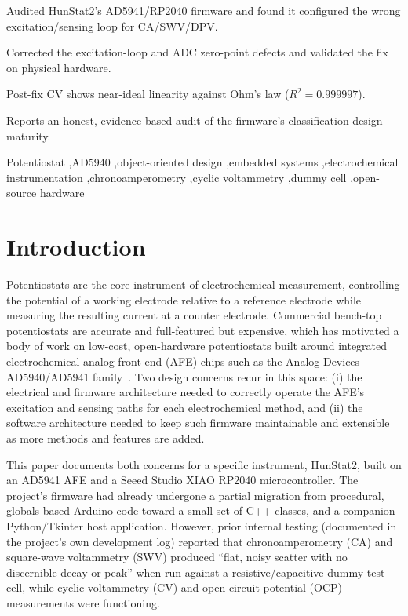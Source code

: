 \documentclass[preprint,12pt]{elsarticle}
\begin{document}
\begin{frontmatter}
\begin{graphicalabstract}
\end{graphicalabstract}

\begin{highlights}
\item Audited HunStat2's AD5941/RP2040 firmware and found it configured the wrong excitation/sensing loop for CA/SWV/DPV.
\item Corrected the excitation-loop and ADC zero-point defects and validated the fix on physical hardware.
\item Post-fix CV shows near-ideal linearity against Ohm's law ($R^2 = 0.999997$).
\item Reports an honest, evidence-based audit of the firmware's classification  design maturity.
\end{highlights}

\begin{keyword}
Potentiostat \sep AD5940 \sep object-oriented design \sep embedded systems \sep electrochemical instrumentation \sep chronoamperometry \sep cyclic voltammetry \sep dummy cell \sep open-source hardware
\end{keyword}

\end{frontmatter}


\section{Introduction}
Potentiostats are the core instrument of electrochemical measurement, controlling the potential of a working electrode relative to a reference electrode while measuring the resulting current at a counter electrode. Commercial bench-top potentiostats are accurate and full-featured but expensive, which has motivated a body of work on low-cost, open-hardware potentiostats built around integrated electrochemical analog front-end (AFE) chips such as the Analog Devices AD5940/AD5941 family~\cite{ref:ad5940datasheet}. Two design concerns recur in this space: (i) the electrical and firmware architecture needed to correctly operate the AFE's excitation and sensing paths for each electrochemical method, and (ii) the software architecture needed to keep such firmware maintainable and extensible as more methods and features are added.

This paper documents both concerns for a specific instrument, HunStat2, built on an AD5941 AFE and a Seeed Studio XIAO RP2040 microcontroller. The project's firmware had already undergone a partial migration from procedural, globals-based Arduino code toward a small set of C++ classes, and a companion Python/Tkinter host application. However, prior internal testing (documented in the project's own development log) reported that chronoamperometry (CA) and square-wave voltammetry (SWV) produced ``flat, noisy scatter with no discernible decay or peak'' when run against a resistive/capacitive dummy test cell, while cyclic voltammetry (CV) and open-circuit potential (OCP) measurements were functioning.
\end{document}
